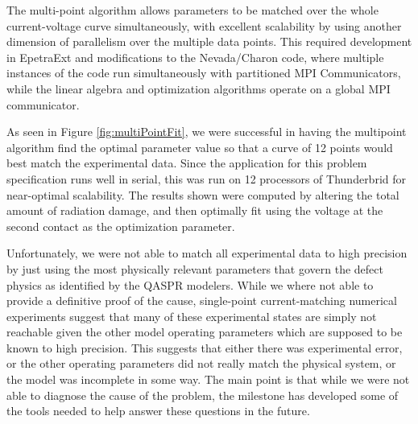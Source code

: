\documentclass[pdf,ps2pdf,11pt]{SANDreport}
\begin{document}


The multi-point algorithm allows parameters to be matched over the whole
current-voltage curve simultaneously, with excellent scalability by using
another dimension of parallelism over the multiple data points.  This required
development in EpetraExt and modifications to the Nevada/Charon code, where
multiple instances of the code run simultaneously with partitioned MPI
Communicators, while the linear algebra and optimization algorithms operate on
a global MPI communicator.




As seen in Figure {}\ref{fig:multiPointFit}, we were successful in having the
multipoint algorithm find the optimal parameter value so that a curve of 12
points would best match the experimental data. Since the application for this
problem specification runs well in serial, this was run on 12 processors of
Thunderbrid for near-optimal scalability.  The results shown were computed by
altering the total amount of radiation damage, and then optimally fit using
the voltage at the second contact as the optimization parameter.

Unfortunately, we were not able to match all experimental data to high
precision by just using the most physically relevant parameters that govern
the defect physics as identified by the QASPR modelers.  While we where not
able to provide a definitive proof of the cause, single-point current-matching
numerical experiments suggest that many of these experimental states are
simply not reachable given the other model operating parameters which are
supposed to be known to high precision.  This suggests that either there was
experimental error, or the other operating parameters did not really match the
physical system, or the model was incomplete in some way.  The main point is
that while we were not able to diagnose the cause of the problem, the
milestone has developed some of the tools needed to help answer these
questions in the future.
\end{document}
